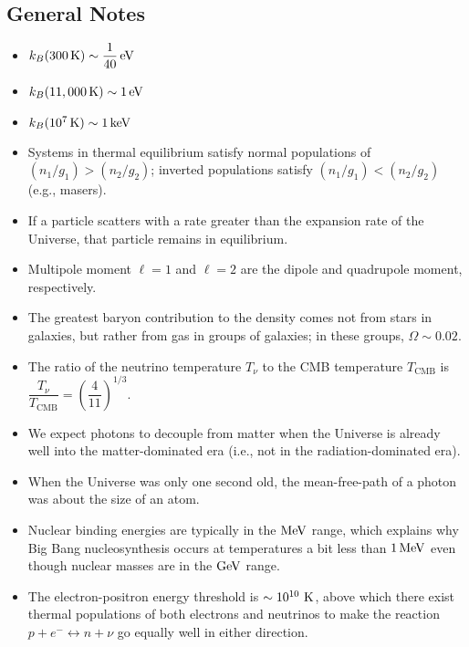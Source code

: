 \documentclass[a4paper,11pt]{article}
\begin{document}

\newpage
\subsection{General Notes}

\begin{itemize}
    \item $k_B(300\,\mathrm{K}) \sim \dfrac{1}{40}\,{\rm eV}$
    \item $k_B(11,000\,\mathrm{K}) \sim 1\,{\rm eV}$
    \item $k_B(10^7\,\mathrm{K}) \sim 1\,{\rm keV}$
    \item Systems in thermal equilibrium satisfy normal populations of $(n_1/g_1)>(n_2/g_2)$; inverted populations satisfy $(n_1/g_1)<(n_2/g_2)$ (e.g., masers).
    \item If a particle scatters with a rate greater than the expansion rate of the Universe, that particle remains in equilibrium.
    \item Multipole moment $\ell=1$ and $\ell=2$ are the dipole and quadrupole moment, respectively.
    \item The greatest baryon contribution to the density comes not from stars in galaxies, but rather from gas in groups of galaxies; in these groups, $\Omega\sim0.02$.
    \item The ratio of the neutrino temperature $T_\nu$ to the CMB temperature $T_\mathrm{CMB}$ is $\dfrac{T_\nu}{T_\mathrm{CMB}} = \left( \dfrac{4}{11} \right)^{1/3}$.
    \item We expect photons to decouple from matter when the Universe is already well into the matter-dominated era (i.e., not in the radiation-dominated era).
    \item When the Universe was only one second old, the mean-free-path of a photon was about the size of an atom.
    \item Nuclear binding energies are typically in the $\rm{MeV}$ range, which explains why Big Bang nucleosynthesis occurs at temperatures a bit less than $1\,\rm{MeV}$ even though nuclear masses are in the $\rm{GeV}$ range.
    \item The electron-positron energy threshold is $\sim10^{10}~{\rm K}$, above which there exist thermal populations of both electrons and neutrinos to make the reaction $p+e^-\leftrightarrow n+\nu$ go equally well in either direction.

\end{itemize}
\end{document}
